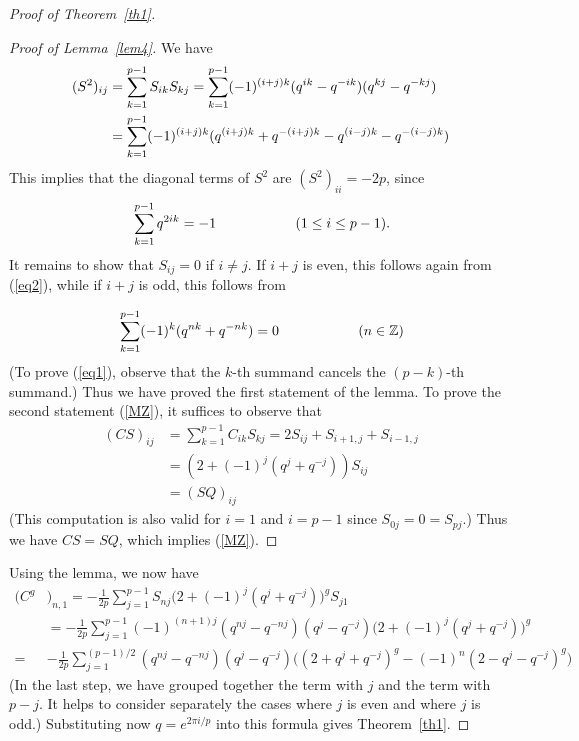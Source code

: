 \documentclass{amsart}
\begin{document}
\begin{proof}[Proof of Theorem~\ref{th1}]
\begin{proof}[Proof of Lemma~\ref{lem4}] We have 
\begin{align} \notag (S^2)_{ij}&=\sum_{k=1}^{p-1} S_{ik}S_{kj}=
  \sum_{k=1}^{p-1} (-1)^{(i+j)k} (q^{ik}-q^{-ik}) (q^{kj}-q^{-kj})\\
{\label{{eq3}}{
	\if{n} y
		\smash{\makebox[0pt]{\hspace{-0.5in}
			\raisebox{8pt}{\tt\tiny {{eq3}}}}}
	\fi
}} &=\sum_{k=1}^{p-1} (-1)^{(i+j)k}(q^{(i+j)k} + q^{-(i+j)k} -
q^{(i-j)k}- q^{-(i-j)k})
\end{align} This implies that the diagonal terms of $S^2$ are $(S^2)_{ii}=-2p$,
since 
\begin{equation} {\label{{eq2}}{
	\if{n} y
		\smash{\makebox[0pt]{\hspace{-0.5in}
			\raisebox{8pt}{\tt\tiny {{eq2}}}}}
	\fi
}}\sum_{k=1}^{p-1} q^{2ik}=-1 \hspace{2cm} (1\leq
  i\leq p-1).
\end{equation} It remains to show that $S_{ij}=0$ if $i\neq j$. If
$i+j$ is even, this follows again from (\ref{eq2}), while if $i+j$ is
odd, this follows from

\begin{equation} {\label{{eq1}}{
	\if{n} y
		\smash{\makebox[0pt]{\hspace{-0.5in}
			\raisebox{8pt}{\tt\tiny {{eq1}}}}}
	\fi
}} \sum_{k=1}^{p-1}(-1)^k (q^{nk} +
q^{-nk})=0 \hspace{2cm} (n\in {{\mathbb{Z}}})\end{equation} (To prove (\ref{eq1}), observe that the
$k$-th summand cancels the $(p-k)$-th summand.) Thus we have proved
the first statement of the lemma.  To prove the second statement
(\ref{MZ}), it suffices to 
observe that 
\begin{align*} (CS)_{ij}&=\sum_{k=1}^{p-1} C_{ik}S_{kj}= 2 S_{ij} +
  S_{i+1,j} + S_{i-1,j}\\
&= \left(2+(-1)^j(q^j+q^{-j})\right)S_{ij}\\
&=(SQ)_{ij}
\end{align*} (This computation is also valid for $i=1$ and $i=p-1$ since
$S_{0j}=0=S_{pj}$.) Thus we have $CS=SQ$, which implies (\ref{MZ}).
\end{proof}

Using the lemma, we now have 
 \begin{align*}(C^g&)_{n,1}=-
  \frac{1}{2p} \sum_{j=1}^{p-1} S_{nj}\Big(2+(-1)^j(q^{j}+q^{-j})\Big)^g S_{j1}\\
&=  -
  \frac{1}{2p}
  \sum_{j=1}^{p-1}(-1)^{(n+1)j}(q^{nj}-q^{-nj})(q^{j}-q^{-j})\Big(2+(-1)^j(q^{j}+q^{-j})\Big)^g\\
=&  -
  \frac{1}{2p}
  \sum_{j=1}^{(p-1)/2}(q^{nj}-q^{-nj})(q^{j}-q^{-j}) 
\Big( (2+q^{j}+q^{-j})^g  - (-1)^{n} (2-q^{j}-q^{-j})^g   \Big) 
\end{align*}
(In the last step, we have grouped together the term with $j$ and the
term with $p-j$. It helps to consider separately the cases  where $j$
is even and where $j$ is odd.)  Substituting now $q=e^{2\pi i/p}$ into this formula gives
Theorem~\ref{th1}.
\end{proof}
\end{document}
